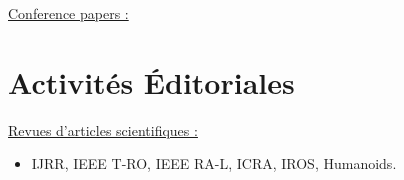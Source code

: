 \documentclass[11pt,a4paper,sans]{moderncv}        %
\newcommand{\items}{\item \hspace{2mm}}
\begin{document}

\large{\underline{Conference papers :}}

\begin{itemize}%
\normalsize{\items} \footnotesize{}
\normalsize{\items} \footnotesize{}
\normalsize{\items} \footnotesize{}
\normalsize{\items} \footnotesize{}
\normalsize{\items} \footnotesize{}
\normalsize{\items} \footnotesize{}
\normalsize{\items} \footnotesize{}
\end{itemize}

\newsavebox\mytempbib
\savebox\mytempbib{\parbox{\textwidth}{}}


\section{Activit\'es  \'Editoriales}
\large{\underline{Revues d'articles scientifiques :}}
\begin{itemize}%
\items IJRR, IEEE T-RO, IEEE RA-L, ICRA, IROS, Humanoids.
\end{itemize}
\end{document}
